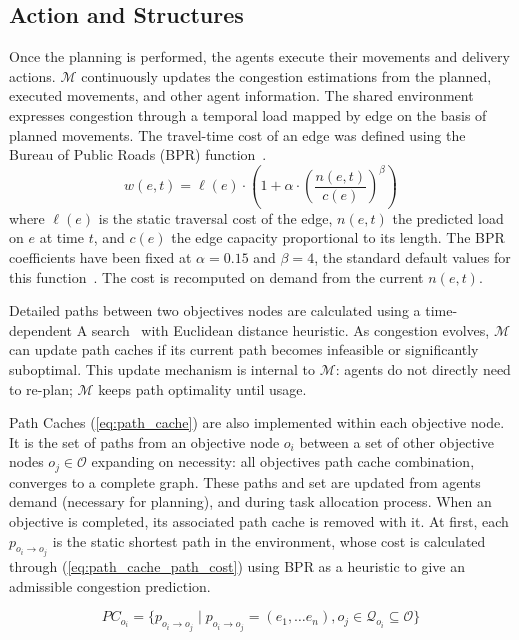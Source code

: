 \documentclass[sigconf]{acmart}
\begin{document}
\subsection{Action and Structures}
 
Once the planning is performed, the agents execute their movements and delivery actions. $\mathcal{M}$ continuously updates the congestion estimations from the planned, executed movements, and other agent information. The shared environment expresses congestion through a temporal load mapped by edge on the basis of planned movements. The travel-time cost of an edge was defined using the Bureau of Public Roads (BPR) function~\cite{bpr1964}.
\begin{equation}
w(e, t) = \ell(e) \cdot \left(1 + \alpha \cdot \left(\frac{n(e, t)}{c(e)}\right)^\beta \right)
\label{eq:bpr}
\end{equation}
where $\ell(e)$ is the static traversal cost of the edge, $n(e, t)$ the predicted load on $e$ at time $t$, and $c(e)$ the edge capacity proportional to its length. The BPR coefficients have been fixed at $\alpha = 0.15$ and $\beta = 4$, the standard default values for this function~\cite{bpr1964}. The cost is recomputed on demand from the current $n(e, t)$.

Detailed paths between two objectives nodes are calculated using a time-dependent A\* search~\cite{demiryurek2011} with Euclidean distance heuristic. As congestion evolves, $\mathcal{M}$ can update path caches if its current path becomes infeasible or significantly suboptimal. This update mechanism is internal to $\mathcal{M}$: agents do not directly need to re-plan; $\mathcal{M}$ keeps path optimality until usage.

Path Caches (\ref{eq:path_cache}) are also implemented within each objective node. It is the set of paths from an objective node $o_i$ between a set of other objective nodes $o_j \in \mathcal{O}$ expanding on necessity: all objectives path cache combination, converges to a complete graph. These paths and set are updated from agents demand (necessary for planning), and during task allocation process. When an objective is completed, its associated path cache is removed with it. At first, each $p_{o_i \to o_j}$ is the static shortest path in the environment, whose cost is calculated through (\ref{eq:path_cache_path_cost}) using BPR as a heuristic to give an admissible congestion prediction.

\begin{equation}
PC_{o_i} = {\{p_{o_i \to o_j} \mid p_{o_i \to o_j} = (e_1, \dots e_n), o_j \in \mathcal{Q}_{o_i} \subseteq \mathcal{O}\}}
\label{eq:path_cache}
\end{equation}
\end{document}
